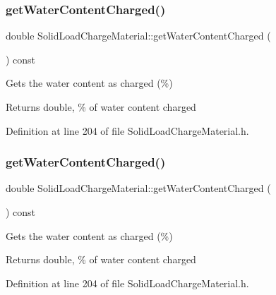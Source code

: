 \subsubsection{\texorpdfstring{get\+Water\+Content\+Charged()}{getWaterContentCharged()}\hspace{0.1cm}{\footnotesize\ttfamily [2/3]}}
{\footnotesize\ttfamily double Solid\+Load\+Charge\+Material\+::get\+Water\+Content\+Charged (\begin{DoxyParamCaption}{ }\end{DoxyParamCaption}) const\hspace{0.3cm}{\ttfamily [inline]}}

Gets the water content as charged (\%) \begin{DoxyReturn}{Returns}
double, \% of water content charged 
\end{DoxyReturn}


Definition at line 204 of file Solid\+Load\+Charge\+Material.\+h.

\mbox{\label{class_solid_load_charge_material_a2f99a8553d12b45bad53acc14338199a}} 
\subsubsection{\texorpdfstring{get\+Water\+Content\+Charged()}{getWaterContentCharged()}\hspace{0.1cm}{\footnotesize\ttfamily [3/3]}}
{\footnotesize\ttfamily double Solid\+Load\+Charge\+Material\+::get\+Water\+Content\+Charged (\begin{DoxyParamCaption}{ }\end{DoxyParamCaption}) const\hspace{0.3cm}{\ttfamily [inline]}}

Gets the water content as charged (\%) \begin{DoxyReturn}{Returns}
double, \% of water content charged 
\end{DoxyReturn}


Definition at line 204 of file Solid\+Load\+Charge\+Material.\+h.

\mbox{\label{class_solid_load_charge_material_aeeb6b341a6b5770155b85264dabbd1a7}} 

